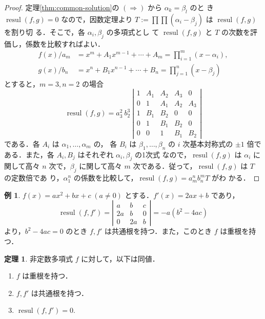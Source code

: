 \documentclass[12pt, uplatex, dvipdfmx]{jsarticle}
\theoremstyle{definition}
\newtheorem{theorem}{定理}
\newtheorem{example}{例}
\DeclareMathOperator{\resul}{resul}
\begin{document}
\begin{proof}
  定理\ref{thm:common-solution}の $(\Rightarrow)$ から $\alpha_k=\beta_l$ のと
  き $\resul(f,g)=0$ なので，因数定理より $T:=\prod \prod (\alpha_i-\beta_j)$ は $\resul(f,g)$ を割り切
  る．そこで，各 $\alpha_i, \beta_j$ の多項式とし
  て $\resul(f,g)$ と $T$ の次数を評価し，係数を比較すればよい．
  \[
    \begin{aligned}
      f(x)/a_m &= x^m + A_{1} x^{m-1} + \cdots + A_m = \prod_{i=1}^{m}(x-\alpha_i),\\
      g(x)/b_n &= x^n + B_{1} x^{n-1} + \cdots + B_n = \prod_{j=1}^{n}(x-\beta_j)
    \end{aligned}
  \]
  とすると，$m=3, n=2$ の場合
  \[
    \resul(f,g) = a_3^2\ b_2^3\ \left|
      \begin{array}{ccccc}
        1 & A_1 & A_2  & A_3 & 0\\
        0 & 1 & A_1 & A_2 & A_3\\
        1 & B_1 & B_2 & 0 & 0 \\
        0 & 1 & B_1 & B_2 & 0\\
        0 & 0 & 1 & B_1 & B_2
      \end{array}
    \right|
  \]
  である．各 $A_i$ は $\alpha_1, \ldots, \alpha_m$ の，
  各 $B_i$ は $\beta_1, \ldots, \beta_n$ の $i$ 次基本対称式の $\pm 1$
  倍である．また，各 $A_i, B_j$ はそれぞれ $\alpha_i, \beta_j$ の1次式
  なので，$\resul(f,g)$ は $\alpha_i$ に関して高々 $n$ 次で，$\beta_j$
  に関して高々 $m$ 次である．従って，$\resul(f,g)$ は $T$ の定数倍であ
  り，$\alpha_1^n$ の係数を比較して，$\resul(f,g) = a_m^n b_n^m T$ がわ
  かる．
\end{proof}

\begin{example}\label{exmp:disc2}
  $f(x) = ax^2+bx+c \; (a \neq 0)$ とする．$f'(x) = 2ax + b$ であり，
  \[
    \resul(f, f') = \left|
      \begin{array}{ccc}
        a & b & c\\
        2a & b & 0\\
        0 & 2a & b
      \end{array}
    \right| =-a (b^2-4ac)
  \]
  より，$b^2-4ac=0$ のとき $f, f'$ は共通根を持つ．また，このとき $f$ は重根を持つ．
\end{example}

\begin{theorem}\label{thm:double-resul}
  非定数多項式 $f$ に対して，以下は同値．
  \begin{enumerate}[(1)]
  \item $f$ は重根を持つ．
  \item $f, f'$ は共通根を持つ．
  \item $\resul(f, f')=0$.
  \end{enumerate}
\end{theorem}
\end{document}
